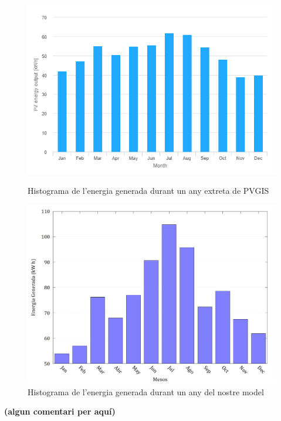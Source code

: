 \documentclass[10pt, twoside, a4paper]{article}
\begin{document}
\begin{figure}[h!]
    \centering
    \begin{minipage}{0.48\linewidth} 
        \centering
        \includegraphics[width=\linewidth]{Histograma_PVGIS.png}
        \caption{Histograma de l'energia generada durant un any extreta de PVGIS}
        \label{fig:figura1}
    \end{minipage}\hfill 
    \begin{minipage}{0.48\linewidth} 
        \centering
        \includegraphics[width=\linewidth]{../Mov_sol/histograma.png}
        \caption{Histograma de l'energia generada durant un any del nostre model}
        \label{fig:figura2}
    \end{minipage}
\end{figure}


\textbf{(algun comentari per aquí)}
\end{document}
